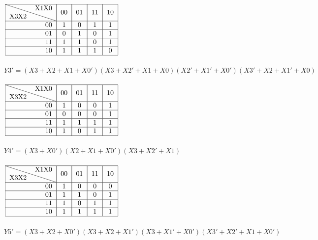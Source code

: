 \documentclass[12pt,a4paper,UTF8]{article}
\begin{document}
{$\left.
  \begin{tabular}[H]{|r|c|c|c|c|}
    \hline
    \diagbox{X3X2}{X1X0} & 00 & 01 & 11 & 10 \\ \hline
    00                   & 1  & 0  & 1  & 1  \\ \hline
    01                   & 0  & 1  & 0  & 1  \\ \hline
    11                   & 1  & 1  & 0  & 1  \\ \hline
    10                   & 1  & 1  & 1  & 0  \\ \hline
  \end{tabular}
  \right.$\\ \\
$Y3' = (X3 + X2 + X1 + X0') (X3 + X2' + X1 + X0)%
  (X2' + X1' + X0') (X3' + X2 + X1' + X0)$
\\ \\
$\left.
  \begin{tabular}[H]{|r|c|c|c|c|}
    \hline
    \diagbox{X3X2}{X1X0} & 00 & 01 & 11 & 10 \\ \hline
    00                   & 1  & 0  & 0  & 1  \\ \hline
    01                   & 0  & 0  & 0  & 1  \\ \hline
    11                   & 1  & 1  & 1  & 1  \\ \hline
    10                   & 1  & 0  & 1  & 1  \\ \hline
  \end{tabular}
  \right.$\\ \\
$Y4' = (X3 + X0') (X2 + X1 + X0') (X3 + X2' + X1)$
\\ \\
$\left.
  \begin{tabular}[H]{|r|c|c|c|c|}
    \hline
    \diagbox{X3X2}{X1X0} & 00 & 01 & 11 & 10 \\ \hline
    00                   & 1  & 0  & 0  & 0  \\ \hline
    01                   & 1  & 1  & 0  & 1  \\ \hline
    11                   & 1  & 0  & 1  & 1  \\ \hline
    10                   & 1  & 1  & 1  & 1  \\ \hline
  \end{tabular}
  \right.$\\ \\
$Y5' = (X3 + X2 + X0') (X3 + X2 + X1') %
  (X3 + X1' + X0') (X3' + X2' + X1 + X0')$
\\ \\
}
\end{document}
